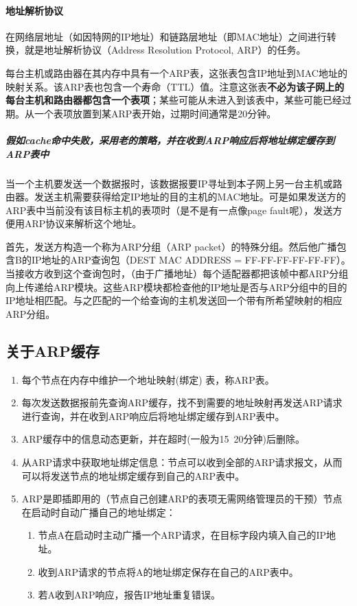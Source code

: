 \documentclass[]{report}
\begin{document}
			\paragraph{地址解析协议}
			在网络层地址（如因特网的IP地址）和链路层地址（即MAC地址）之间进行转换，就是地址解析协议（Address Resolution Protocol, ARP）的任务。\par
			每台主机或路由器在其内存中具有一个ARP表，这张表包含IP地址到MAC地址的映射关系。该ARP表也包含一个寿命（TTL）值。注意这张表\textbf{不必为该子网上的每台主机和路由器都包含一个表项}；某些可能从未进入到该表中，某些可能已经过期。从一个表项放置到某ARP表开始，过期时间通常是20分钟。\par
				\subparagraph{假如cache命中失败，采用老的策略，并在收到ARP响应后将地址绑定缓存到ARP表中}
				当一个主机要发送一个数据报时，该数据报要IP寻址到本子网上另一台主机或路由器。发送主机需要获得给定IP地址的目的主机的MAC地址。可是如果发送方的ARP表中当前没有该目标主机的表项时（是不是有一点像page fault呢），发送方便用ARP协议来解析这个地址。\par
				首先，发送方构造一个称为ARP分组（ARP packet）的特殊分组。然后他广播包含B的IP地址的ARP查询包（DEST MAC ADDRESS = FF-FF-FF-FF-FF-FF）。当接收方收到这个查询包时，（由于广播地址）每个适配器都把该帧中都ARP分组向上传递给ARP模块。这些ARP模块都检查他的IP地址是否与ARP分组中的目的IP地址相匹配。与之匹配的一个给查询的主机发送回一个带有所希望映射的相应ARP分组。
				\subsection{关于ARP缓存}
				\begin{enumerate}
					\item 每个节点在内存中维护一个地址映射(绑定)
					表，称ARP表。
					\item 每次发送数据报前先查询ARP缓存，找不到需要的地址映射再发送ARP请求进行查询，并在收到ARP响应后将地址绑定缓存到ARP表中。
					\item ARP缓存中的信息动态更新，并在超时(一般为15~20分钟)后删除。
					\item 从ARP请求中获取地址绑定信息：节点可以收到全部的ARP请求报文，从而可以将发送节点的地址绑定缓存到自己的ARP表中。
					\item ARP是即插即用的（节点自己创建ARP的表项无需网络管理员的干预）节点在启动时自动广播自己的地址绑定：
					\begin{enumerate}
						\item 节点A在启动时主动广播一个ARP请求，在目标字段内填入自己的IP地址。
						\item 收到ARP请求的节点将A的地址绑定保存在自己的ARP表中。
						\item 若A收到ARP响应，报告IP地址重复错误。
					\end{enumerate}
				\end{enumerate}
\end{document}
